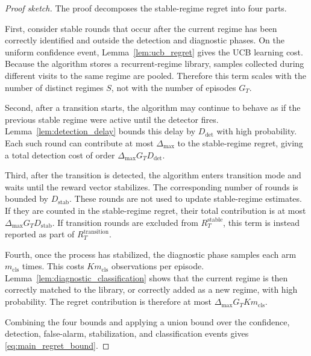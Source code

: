 \documentclass[11pt]{article}
\begin{document}
\begin{proof}[Proof sketch]
The proof decomposes the stable-regime regret into four parts.

First, consider stable rounds that occur after the current regime has been correctly identified and outside the detection and diagnostic phases. On the uniform confidence event, Lemma~\ref{lem:ucb_regret} gives the UCB learning cost. Because the algorithm stores a recurrent-regime library, samples collected during different visits to the same regime are pooled. Therefore this term scales with the number of distinct regimes $S$, not with the number of episodes $G_T$.

Second, after a transition starts, the algorithm may continue to behave as if the previous stable regime were active until the detector fires. Lemma~\ref{lem:detection_delay} bounds this delay by $D_{\mathrm{det}}$ with high probability. Each such round can contribute at most $\Delta_{\max}$ to the stable-regime regret, giving a total detection cost of order $\Delta_{\max}G_TD_{\mathrm{det}}$.

Third, after the transition is detected, the algorithm enters transition mode and waits until the reward vector stabilizes. The corresponding number of rounds is bounded by $D_{\mathrm{stab}}$. These rounds are not used to update stable-regime estimates. If they are counted in the stable-regime regret, their total contribution is at most $\Delta_{\max}G_TD_{\mathrm{stab}}$. If transition rounds are excluded from $R_T^{\mathrm{stable}}$, this term is instead reported as part of $R_T^{\mathrm{transition}}$.

Fourth, once the process has stabilized, the diagnostic phase samples each arm $m_{\mathrm{cls}}$ times. This costs $K m_{\mathrm{cls}}$ observations per episode. Lemma~\ref{lem:diagnostic_classification} shows that the current regime is then correctly matched to the library, or correctly added as a new regime, with high probability. The regret contribution is therefore at most $\Delta_{\max}G_TK m_{\mathrm{cls}}$.

Combining the four bounds and applying a union bound over the confidence, detection, false-alarm, stabilization, and classification events gives \eqref{eq:main_regret_bound}.
\end{proof}
\end{document}
